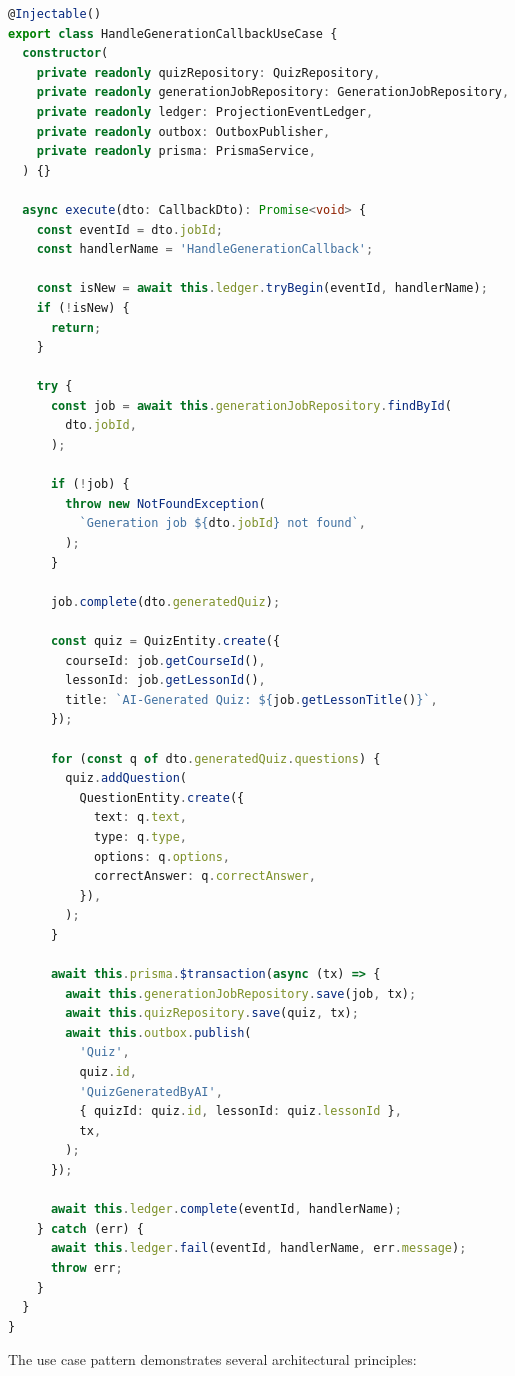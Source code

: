 \begin{lstlisting}[language=TypeScript,caption=HandleGenerationCallbackUseCase,label=lst:handle-callback]
@Injectable()
export class HandleGenerationCallbackUseCase {
  constructor(
    private readonly quizRepository: QuizRepository,
    private readonly generationJobRepository: GenerationJobRepository,
    private readonly ledger: ProjectionEventLedger,
    private readonly outbox: OutboxPublisher,
    private readonly prisma: PrismaService,
  ) {}

  async execute(dto: CallbackDto): Promise<void> {
    const eventId = dto.jobId;
    const handlerName = 'HandleGenerationCallback';

    const isNew = await this.ledger.tryBegin(eventId, handlerName);
    if (!isNew) {
      return;
    }

    try {
      const job = await this.generationJobRepository.findById(
        dto.jobId,
      );

      if (!job) {
        throw new NotFoundException(
          `Generation job ${dto.jobId} not found`,
        );
      }

      job.complete(dto.generatedQuiz);

      const quiz = QuizEntity.create({
        courseId: job.getCourseId(),
        lessonId: job.getLessonId(),
        title: `AI-Generated Quiz: ${job.getLessonTitle()}`,
      });

      for (const q of dto.generatedQuiz.questions) {
        quiz.addQuestion(
          QuestionEntity.create({
            text: q.text,
            type: q.type,
            options: q.options,
            correctAnswer: q.correctAnswer,
          }),
        );
      }

      await this.prisma.$transaction(async (tx) => {
        await this.generationJobRepository.save(job, tx);
        await this.quizRepository.save(quiz, tx);
        await this.outbox.publish(
          'Quiz',
          quiz.id,
          'QuizGeneratedByAI',
          { quizId: quiz.id, lessonId: quiz.lessonId },
          tx,
        );
      });

      await this.ledger.complete(eventId, handlerName);
    } catch (err) {
      await this.ledger.fail(eventId, handlerName, err.message);
      throw err;
    }
  }
}
\end{lstlisting}

The use case pattern demonstrates several architectural principles:

